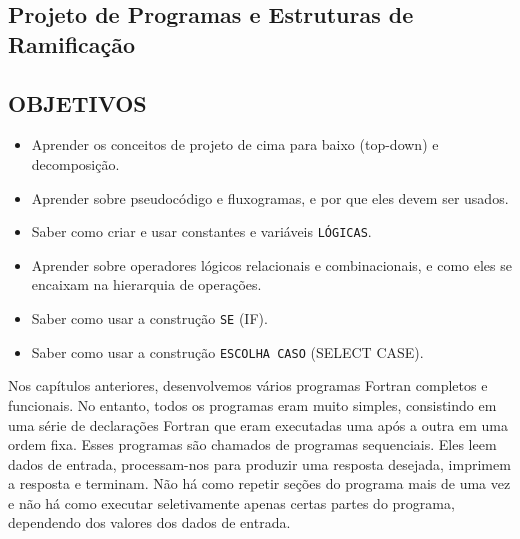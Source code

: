 \documentclass[11pt,a4paper]{book}
\begin{document}
	
	\begin{flushright} %
		\chapter{Projeto de Programas e Estruturas de Ramificação} %
	\end{flushright}
	
	\vspace{1cm} %
	
	\section*{OBJETIVOS} %
	
	\begin{tcolorbox}[colback=lightgray!30,arc=0pt,outer arc=0pt,boxrule=0pt,toprule=0.4mm,bottomrule=0.4mm,right=0mm,left=0mm] %
		\begin{itemize}
			\item Aprender os conceitos de projeto de cima para baixo (top-down) e decomposição.
			\item Aprender sobre pseudocódigo e fluxogramas, e por que eles devem ser usados.
			\item Saber como criar e usar constantes e variáveis \texttt{LÓGICAS}.
			\item Aprender sobre operadores lógicos relacionais e combinacionais, e como eles se encaixam na hierarquia de operações.
			\item Saber como usar a construção \texttt{SE} (IF).
			\item Saber como usar a construção \texttt{ESCOLHA CASO} (SELECT CASE).
		\end{itemize}
	\end{tcolorbox}
	
	\vspace{1cm} %
	
	Nos capítulos anteriores, desenvolvemos vários programas Fortran completos e funcionais. No entanto, todos os programas eram muito simples, consistindo em uma série de declarações Fortran que eram executadas uma após a outra em uma ordem fixa. Esses programas são chamados de programas sequenciais. Eles leem dados de entrada, processam-nos para produzir uma resposta desejada, imprimem a resposta e terminam. Não há como repetir seções do programa mais de uma vez e não há como executar seletivamente apenas certas partes do programa, dependendo dos valores dos dados de entrada.
	
\end{document}
